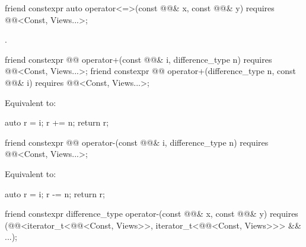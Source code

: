 %
\begin{itemdecl}
friend constexpr auto operator<=>(const @@& x, const @@& y)
  requires @@<Const, Views...>;
\end{itemdecl}

\begin{itemdescr}
\pnum
\returns
{}.
\end{itemdescr}

%
\begin{itemdecl}
friend constexpr @@ operator+(const @@& i, difference_type n)
  requires @@<Const, Views...>;
friend constexpr @@ operator+(difference_type n, const @@& i)
  requires @@<Const, Views...>;
\end{itemdecl}

\begin{itemdescr}
\pnum
\effects
Equivalent to:
\begin{codeblock}
auto r = i;
r += n;
return r;
\end{codeblock}
\end{itemdescr}

%
\begin{itemdecl}
friend constexpr @@ operator-(const @@& i, difference_type n)
  requires @@<Const, Views...>;
\end{itemdecl}

\begin{itemdescr}
\pnum
\effects
Equivalent to:
\begin{codeblock}
auto r = i;
r -= n;
return r;
\end{codeblock}
\end{itemdescr}

%
\begin{itemdecl}
friend constexpr difference_type operator-(const @@& x, const @@& y)
  requires (@@<iterator_t<@@<Const, Views>>,
                               iterator_t<@@<Const, Views>>> && ...);
\end{itemdecl}

